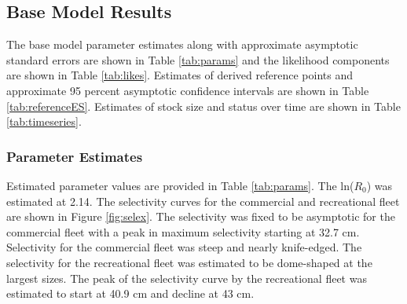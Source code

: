 \documentclass[11pt,
  english,
  a4paper,
]{article}
\begin{document}

\hypertarget{base-model-results}{%
\subsection{Base Model Results}\label{base-model-results}}

\leavevmode\tagmcend\tagstructend


The base model parameter estimates along with approximate asymptotic standard errors are shown in Table \ref{tab:params} and the likelihood components are shown in Table \ref{tab:likes}. Estimates of derived reference points and approximate 95 percent asymptotic confidence intervals are shown in Table \ref{tab:referenceES}. Estimates of stock size and status over time are shown in Table \ref{tab:timeseries}.

\leavevmode\tagmcend\tagstructend\par


\hypertarget{parameter-estimates}{%
\subsubsection{Parameter Estimates}\label{parameter-estimates}}

\leavevmode\tagmcend\tagstructend


Estimated parameter values are provided in Table \ref{tab:params}. The ln({\(R_0\)\leavevmode\tagmcend\tagstructend}) was estimated at 2.14. The selectivity curves for the commercial and recreational fleet are shown in Figure \ref{fig:selex}. The selectivity was fixed to be asymptotic for the commercial fleet with a peak in maximum selectivity starting at 32.7 cm. Selectivity for the commercial fleet was steep and nearly knife-edged. The selectivity for the recreational fleet was estimated to be dome-shaped at the largest sizes. The peak of the selectivity curve by the recreational fleet was estimated to start at 40.9 cm and decline at 43 cm.

\leavevmode\tagmcend\tagstructend\par

\end{document}
